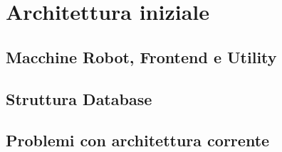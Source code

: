 \chapter{Architettura iniziale}
\label{cha:architettura_iniziale}

\section{Macchine Robot, Frontend e Utility}
\label{sec:macchine}

\lipsum[1]

\section{Struttura Database}
\label{sec:database}

\lipsum[1]

\section{Problemi con architettura corrente}
\label{sec:problemi}

\lipsum[1]